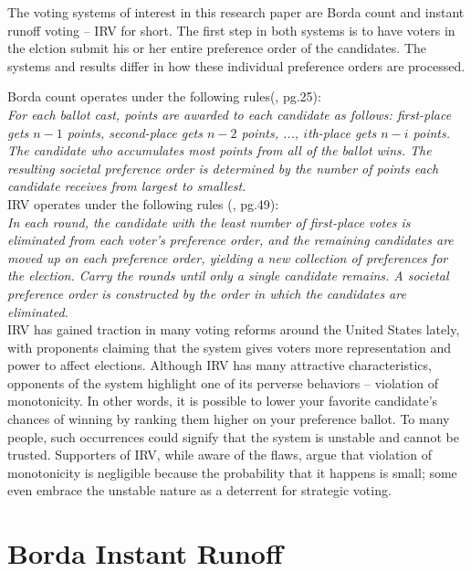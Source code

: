 \documentclass{article}
\begin{document}
	
The voting systems of interest in this research paper are Borda count and instant runoff voting – IRV for short. The first step in both systems is to have voters in the elction submit his or her entire preference order of the candidates. The systems and results differ in how these individual preference orders are processed.

Borda count operates under the following rules(\cite{Textbook}, pg.25):\\

\textit{For each ballot cast, points are awarded to each candidate as follows: first-place gets $n-1$ points, second-place gets $n-2$ points, ..., $i$th-place gets $n-i$ points. The candidate who accumulates most points from all of the ballot wins. The resulting societal preference order is determined by the number of points each candidate receives from largest to smallest.}\\

IRV operates under the following rules (\cite{Textbook}, pg.49):\\

\textit{In each round, the candidate with the least number of first-place votes is eliminated from each voter’s preference order, and the remaining candidates are moved up on each preference order, yielding a new collection of preferences for the election. Carry the rounds until only a single candidate remains. A societal preference order is constructed by the order in which the candidates are eliminated.}\\

IRV has gained traction in many voting reforms around the United States lately, with proponents claiming that the system gives voters more representation and power to affect elections. Although IRV has many attractive characteristics, opponents of the system highlight one of its perverse behaviors – violation of monotonicity. In other words, it is possible to lower your favorite candidate’s chances of winning by ranking them higher on your preference ballot. To many people, such occurrences could signify that the system is unstable and cannot be trusted. Supporters of IRV, while aware of the flaws, argue that violation of monotonicity is negligible because the probability that it happens is small; some even embrace the unstable nature as a deterrent for strategic voting. 

\section{Borda Instant Runoff}
\end{document}
